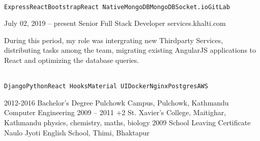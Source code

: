 \documentclass[9pt]{developercv} %
\begin{document}
\begin{entrylist}
{		
		\\ \texttt{Express}\slashsep\texttt{React}\slashsep\texttt{Bootstrap}\slashsep\texttt{React Native}\slashsep\texttt{MongoDB}\slashsep\texttt{MongoDB}\slashsep\texttt{Socket.io}\slashsep\texttt{GitLab}}
		
		
	  \entry
		 {July 02, 2019 -- present}
		{Senior Full Stack Developer}
		{services.khalti.com}
		{
		During this period, my role was intergrating new Thirdparty Services, distributing tasks among the team,  migrating existing AngularJS applications to React and optimizing the database queries.
		
		\\ \texttt{Django}\slashsep\texttt{Python}\slashsep\texttt{React Hooks}\slashsep\texttt{Material UI}\slashsep\texttt{Docker}\slashsep\texttt{Nginx}\slashsep\texttt{Postgres}\slashsep\texttt{AWS}}
\end{entrylist}



\begin{entrylist}
	\entry
		{2012-2016}
		{Bachelor's Degree}
		{Pulchowk Campus, Pulchowk, Kathmandu}
		{Computer Engineering}
	\entry
		{2009 -- 2011}
		{+2}
		{St. Xavier's College, Maitighar, Kathmandu}
		{physics, chemistry, maths, biology}
	\entry
		{2009}
		{School Leaving Certificate}
		{Naulo Jyoti English School, Thimi, Bhaktapur}
		{\lorem\lorem}
\end{entrylist}

\end{document}
